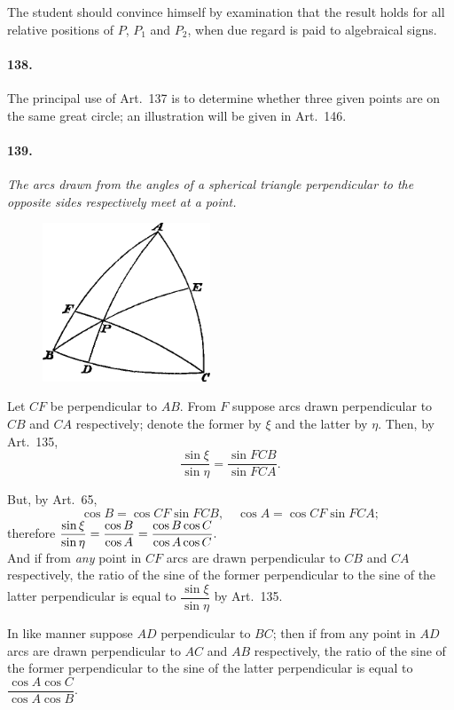 \documentclass{book}[2004/02/16]
\begin{document}
\begin{mainmatter}
\begin{spacing}{1.3}
The student should convince himself by examination that the
result holds for all relative positions of $P$, $P_1$ and $P_2$, when due
regard is paid to algebraical signs.

\paragraph{138.} The principal use of Art.\ 137 is to determine whether
three given points are on the same great circle; an illustration
will be given in Art.\ 146.

\paragraph{139.} \textit{The arcs drawn from the angles of a spherical triangle
perpendicular to the opposite sides respectively meet at a point.}
\begin{figure}[htp]
\centering
\includegraphics[width=5.0cm]{images/110fc}
\end{figure}

Let $CF$ be perpendicular to $AB$. From $F$ suppose arcs drawn
perpendicular to $CB$ and $CA$ respectively; denote the former by
$\xi$ and the latter by $\eta$. Then, by Art.\ 135,
\[
\frac{\sin\xi}{\sin\eta} = \frac{\sin FCB}{\sin FCA}.
\]

But, by Art.\ 65,
\[
  \cos B = \cos CF \sin FCB, \quad \cos A = \cos CF \sin FCA;
\]
therefore $\hfill\displaystyle
  \frac{\sin\xi}{\sin\eta}
= \frac{\cos B}{\cos A}
= \frac{\cos B \cos C}{\cos A \cos C}. \hfill\phantom{therefore}$\\[2ex]
And if from \textit{any} point in $CF$ arcs are drawn perpendicular to
$CB$ and $CA$ respectively, the ratio of the sine of the former perpendicular
to the sine of the latter perpendicular is equal to $\dfrac{\sin\xi}{\sin\eta}$
by Art.\ 135.

In like manner suppose $AD$ perpendicular to $BC$; then if from
any point in $AD$ arcs are drawn perpendicular to $AC$ and $AB$
respectively, the ratio of the sine of the former perpendicular to
the sine of the latter perpendicular is equal to $\dfrac{\cos A \cos C}{\cos A \cos B}$.\\[1ex]


\end{spacing}
\end{mainmatter}
\end{document}
